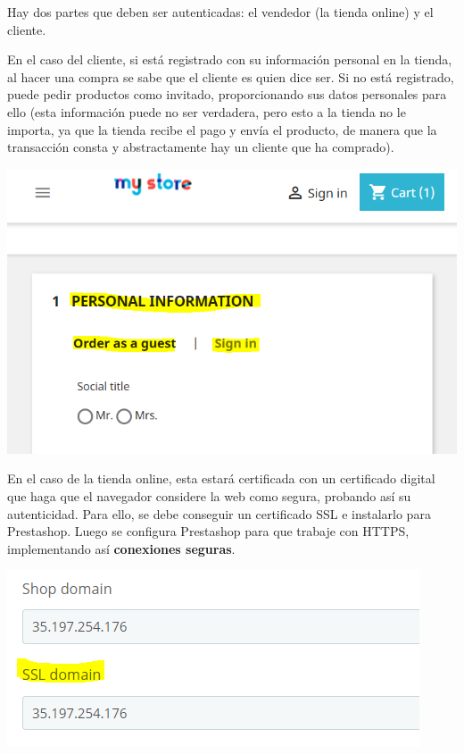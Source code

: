\documentclass{article}
\begin{document}
Hay dos partes que deben ser autenticadas: el vendedor (la tienda online) y el cliente.

En el caso del cliente, si está registrado con su información personal en la tienda, al hacer una compra se sabe que el cliente es quien dice ser. Si no está registrado, puede pedir productos como invitado, proporcionando sus datos personales para ello (esta información puede no ser verdadera, pero esto a la tienda no le importa, ya que la tienda recibe el pago y envía el producto, de manera que la transacción consta y abstractamente hay un cliente que ha comprado).

\begin{center}
\includegraphics[scale=0.4]{images/autenticacion.png}
\end{center}

En el caso de la tienda online, esta estará certificada con un certificado digital que haga que el navegador considere la web como segura, probando así su autenticidad. Para ello, se debe conseguir un certificado SSL e instalarlo para Prestashop. Luego se configura Prestashop para que trabaje con HTTPS, implementando así \textbf{conexiones seguras}. 

\begin{center}
\includegraphics[scale=0.4]{images/auten.png}
\end{center}
\end{document}
